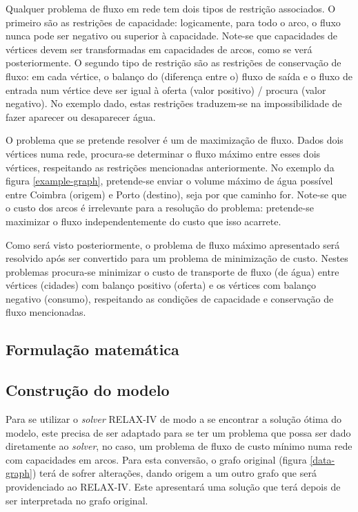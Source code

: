\documentclass[12pt, a4paper, titlepage]{article}
\begin{document}
Qualquer problema de fluxo em rede tem dois tipos de restrição associados. O primeiro são as
restrições de capacidade: logicamente, para todo o arco, o fluxo nunca pode ser negativo ou superior
à capacidade. Note-se que capacidades de vértices devem ser transformadas em capacidades de arcos,
como se verá posteriormente. O segundo tipo de restrição são as restrições de conservação de fluxo:
em cada vértice, o balanço do (diferença entre o) fluxo de saída e o fluxo de entrada num vértice
deve ser igual à oferta (valor positivo) / procura (valor negativo). No exemplo dado, estas
restrições traduzem-se na impossibilidade de fazer aparecer ou desaparecer água.


O problema que se pretende resolver é um de maximização de fluxo. Dados dois vértices numa rede,
procura-se determinar o fluxo máximo entre esses dois vértices, respeitando as restrições
mencionadas anteriormente. No exemplo da figura \ref{example-graph}, pretende-se enviar o volume
máximo de água possível entre Coimbra (origem) e Porto (destino), seja por que caminho for. Note-se
que o custo dos arcos é irrelevante para a resolução do problema: pretende-se maximizar o fluxo
independentemente do custo que isso acarrete.

Como será visto posteriormente, o problema de fluxo máximo apresentado será resolvido após ser
convertido para um problema de minimização de custo. Nestes problemas procura-se minimizar o custo
de transporte de fluxo (de água) entre vértices (cidades) com balanço positivo (oferta) e os
vértices com balanço negativo (consumo), respeitando as condições de capacidade e conservação de
fluxo mencionadas.

\subsection{Formulação matemática}


\subsection{Construção do modelo}

Para se utilizar o \emph{solver} RELAX-IV \cite{relax} de modo a se encontrar a solução ótima do
modelo, este precisa de ser adaptado para se ter um problema que possa ser dado diretamente ao
\emph{solver}, no caso, um problema de fluxo de custo mínimo numa rede com capacidades em arcos.
Para esta conversão, o grafo original (figura \ref{data-graph}) terá de sofrer alterações, dando
origem a um outro grafo que será providenciado ao RELAX-IV. Este apresentará uma solução que terá
depois de ser interpretada no grafo original.
\end{document}
